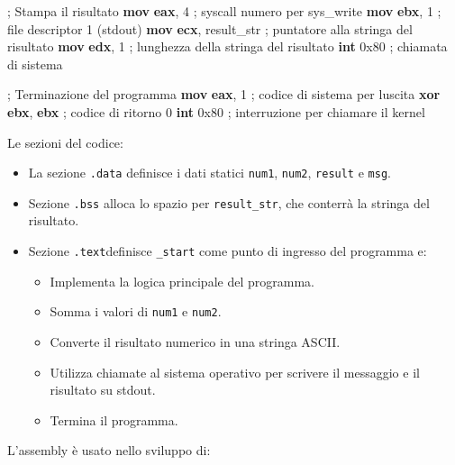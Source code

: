 \documentclass[
  letterpaper,
]{scrbook}
\newenvironment{Shaded}{\begin{snugshade}}{\end{snugshade}}
\newcommand{\BaseNTok}[1]{\textcolor[rgb]{0.68,0.00,0.00}{#1}}
\newcommand{\CommentTok}[1]{\textcolor[rgb]{0.37,0.37,0.37}{#1}}
\newcommand{\DecValTok}[1]{\textcolor[rgb]{0.68,0.00,0.00}{#1}}
\newcommand{\KeywordTok}[1]{\textcolor[rgb]{0.00,0.23,0.31}{\textbf{#1}}}
\newcommand{\NormalTok}[1]{\textcolor[rgb]{0.00,0.23,0.31}{#1}}
\newcommand{\OperatorTok}[1]{\textcolor[rgb]{0.37,0.37,0.37}{#1}}
\providecommand{\tightlist}{%
  \setlength{\itemsep}{0pt}\setlength{\parskip}{0pt}}\usepackage{longtable,booktabs,array}
\begin{document}
\begin{Shaded}
\begin{Highlighting}[]
    \CommentTok{; Stampa il risultato}
    \KeywordTok{mov} \KeywordTok{eax}\OperatorTok{,} \DecValTok{4}          \CommentTok{; syscall numero per sys\_write}
    \KeywordTok{mov} \KeywordTok{ebx}\OperatorTok{,} \DecValTok{1}          \CommentTok{; file descriptor 1 (stdout)}
    \KeywordTok{mov} \KeywordTok{ecx}\OperatorTok{,}\NormalTok{ result\_str }\CommentTok{; puntatore alla stringa del risultato}
    \KeywordTok{mov} \KeywordTok{edx}\OperatorTok{,} \DecValTok{1}          \CommentTok{; lunghezza della stringa del risultato}
    \KeywordTok{int} \BaseNTok{0x80}            \CommentTok{; chiamata di sistema}

    \CommentTok{; Terminazione del programma}
    \KeywordTok{mov} \KeywordTok{eax}\OperatorTok{,} \DecValTok{1}          \CommentTok{; codice di sistema per l\textquotesingle{}uscita}
    \KeywordTok{xor} \KeywordTok{ebx}\OperatorTok{,} \KeywordTok{ebx}        \CommentTok{; codice di ritorno 0}
    \KeywordTok{int} \BaseNTok{0x80}            \CommentTok{; interruzione per chiamare il kernel}
\end{Highlighting}
\end{Shaded}

Le sezioni del codice:

\begin{itemize}
\item
  La sezione \texttt{.data} definisce i dati statici \texttt{num1},
  \texttt{num2}, \texttt{result} e \texttt{msg}.
\item
  Sezione \texttt{.bss} alloca lo spazio per \texttt{result\_str}, che
  conterrà la stringa del risultato.
\item
  Sezione \texttt{.text}definisce \texttt{\_start} come punto di
  ingresso del programma e:

  \begin{itemize}
  \tightlist
  \item
    Implementa la logica principale del programma.
  \item
    Somma i valori di \texttt{num1} e \texttt{num2}.
  \item
    Converte il risultato numerico in una stringa ASCII.
  \item
    Utilizza chiamate al sistema operativo per scrivere il messaggio e
    il risultato su stdout.
  \item
    Termina il programma.
  \end{itemize}
\end{itemize}

L'assembly è usato nello sviluppo di:
\end{document}
